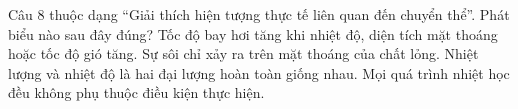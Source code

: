 \begin{ex}
Câu 8 thuộc dạng “Giải thích hiện tượng thực tế liên quan đến chuyển thể”. Phát biểu nào sau đây đúng?
\choice
{\True Tốc độ bay hơi tăng khi nhiệt độ, diện tích mặt thoáng hoặc tốc độ gió tăng.}
{Sự sôi chỉ xảy ra trên mặt thoáng của chất lỏng.}
{Nhiệt lượng và nhiệt độ là hai đại lượng hoàn toàn giống nhau.}
{Mọi quá trình nhiệt học đều không phụ thuộc điều kiện thực hiện.}
\end{ex}
